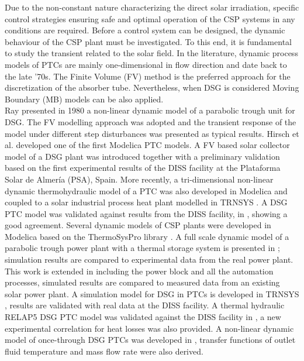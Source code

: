 \documentclass[final,3p,times,review]{elsarticle}
\begin{document}
Due to the non-constant nature characterizing the direct solar irradiation, specific control strategies ensuring safe and optimal operation of the CSP systems in any conditions are required. Before a control system can be designed, the dynamic behaviour of the CSP plant must be investigated.
To this end,  it is fundamental to study the transient related to the solar field. In the literature,  dynamic process models of PTCs are mainly one-dimensional in flow direction and date back to the late ’70s. The Finite Volume (FV) method is the preferred approach for the discretization of the absorber tube. Nevertheless, when DSG is considered Moving Boundary (MB) models can be also applied.\\

Ray \cite{Ray1981} presented in 1980 a non-linear dynamic model of a parabolic trough unit for DSG. The FV modelling approach was adopted and the transient response of the model under different step disturbances was presented as typical results. Hirsch et al. \cite{Hirsch2005,Eck2007} developed one of the first Modelica PTC models.  A FV based solar collector model of a DSG plant was introduced together with a preliminary validation based on the first experimental results of the DISS facility at the Plataforma Solar de Almer\'ia (PSA), Spain. More recently, a tri-dimensional non-linear dynamic thermohydraulic model of a PTC was also developed in Modelica and coupled to a solar industrial process heat plant modelled in TRNSYS \citep{Silva2013}. A DSG PTC model was validated against results from the DISS facility, in \cite{Lobon2014}, showing a good agreement. Several dynamic models of CSP plants were developed in Modelica based on the ThermoSysPro library \citep{Hefni2014}.  A full scale dynamic model of a parabolic trough power plant with a thermal storage system is presented in \cite{Almaliki2016_1}; simulation results are compared to experimental data from the real power plant.
This work is extended in \cite{Almaliki2016_2} including the power block and all the automation processes, simulated results are compared to measured data from an existing solar power plant. A simulation model for DSG in PTCs is developed in TRNSYS \cite{Biencinto2016}, results are validated with real data at the DISS facility. A thermal hydraulic RELAP5 DSG PTC model was validated against the DISS facility in \cite{Serrano2017}, a new experimental correlation for heat losses was also provided. A non-linear dynamic model of once-through DSG PTCs was developed in \citep{Guo2017}, transfer functions of outlet fluid temperature and mass flow rate were also derived.\\
\end{document}
